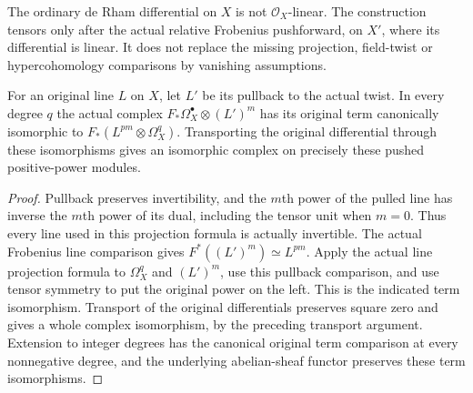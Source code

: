 The ordinary de Rham differential on $X$ is not
$\mathcal O_X$-linear.  The construction tensors only after the
actual relative Frobenius pushforward, on $X'$, where its differential
is linear.  It does not replace the missing projection, field-twist
or hypercohomology comparisons by vanishing assumptions.

\begin{lemma}
\label{lem:kn-amplified-cartier-terms}
\leanok
{}
For an original line $L$ on $X$, let $L'$ be its pullback to the
actual twist.  In every degree $q$ the actual complex
$F_*\Omega_X^\bullet\otimes (L')^m$ has its original term canonically
isomorphic to $F_*(L^{pm}\otimes\Omega_X^q)$.  Transporting the
original differential through these isomorphisms gives an isomorphic
complex on precisely these pushed positive-power modules.
\end{lemma}
\begin{proof}
Pullback preserves invertibility, and the $m$th power of the pulled
line has inverse the $m$th power of its dual, including the tensor
unit when $m=0$.  Thus every line used in this projection formula
is actually invertible.
The actual Frobenius line comparison gives
$F^*((L')^m)\simeq L^{pm}$.  Apply the actual line projection
formula to $\Omega_X^q$ and $(L')^m$, use this pullback comparison,
and use tensor symmetry to put the original power on the left.
This is the indicated term isomorphism.  Transport of the original
differentials preserves square zero and gives a whole complex
isomorphism, by the preceding transport argument.  Extension to
integer degrees has the canonical original term comparison at every
nonnegative degree, and the underlying abelian-sheaf functor
preserves these term isomorphisms.
\end{proof}

